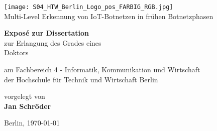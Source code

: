 \documentclass[
    a4paper,
    pagesize,
	pdftex,
    12pt,
]{scrartcl}
\begin{document}
\begin{titlepage}
    \begin{center}
        
        \texttt{[image: S04\_HTW\_Berlin\_Logo\_pos\_FARBIG\_RGB.jpg]} \\
        \vspace{1.0cm}
         Multi-Level Erkennung von IoT-Botnetzen in frühen Botnetzphasen
             
        \vspace{1.5cm}
 
        \textbf{Exposé zur Dissertation} \\    
        zur Erlangung des Grades eines\\
        Doktors

        \vspace{1.5cm}
        am Fachbereich 4 - Informatik, Kommunikation und Wirtschaft\\
        der Hochschule für Technik und Wirtschaft Berlin\\
        
        \vspace{1.5cm}

        vorgelegt von \\
        \textbf{Jan Schröder}
      
        \vspace{1.5cm}    
        Berlin, \today\\
        
             
    \end{center}
\end{titlepage}


\tableofcontents
\newpage



\newpage

\newpage

\newpage

\newpage

\newpage

\newpage

\newpage



\end{document}

